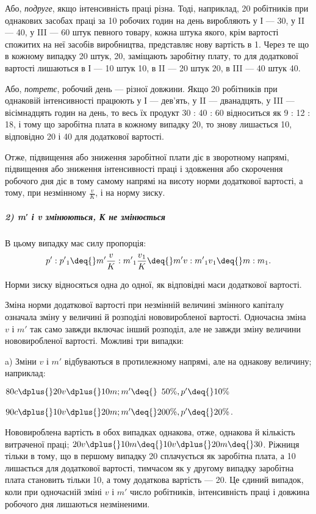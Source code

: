 Або, \emph{подруге}, якщо інтенсивність праці різна. Тоді, наприклад,
20 робітників при однакових засобах праці за 10 робочих
годин на день виробляють у І — 30, у II — 40, у III — 60 штук
певного товару, кожна штука якого, крім вартості спожитих
на неї засобів виробництва, представляє нову вартість в 1. Через те що в кожному випадку 20 штук, \deq{} 20, заміщають заробітну плату, то для додаткової
вартості лишаються в І — 10 штук \deq{} 10,
в II — 20 штук \deq{} 20, в III — 40 штук \deq{} 40.

Або, \emph{потретє}, робочий день — різної довжини. Якщо 20 робітників
при однаковій інтенсивності працюють у І — дев’ять,
у II — дванадцять, у III — вісімнадцять годин на день, то весь їх
продукт 30 : 40 : 60 відноситься як 9 : 12 : 18, і тому що заробітна
плата в кожному випадку \deq{} 20, то знову лишається 10, відповідно
20 і 40 для додаткової вартості.

Отже, підвищення або зниження заробітної плати діє в зворотному
напрямі, підвищення або зниження інтенсивності праці
і здовження або скорочення робочого дня діє в тому самому
напрямі на висоту норми додаткової вартості, а тому, при незмінному
$\frac{v}{K}$, і на норму зиску.

\subparagraph*{2) m′ і v змінюються, К не змінюється}
В цьому випадку має силу пропорція:\[
p': p'\textsubscript{1} \deq{} m' \frac{v}{K} : m'\textsubscript{1} \frac{v\textsubscript{1}}{K} \deq{} m'v : m'\textsubscript{1}v\textsubscript{1} \deq{} m : m\textsubscript{1}.\]

Норми зиску відносяться одна до одної, як відповідні маси
додаткової вартості.

Зміна норми додаткової вартості при незмінній величині змінного
капіталу означала зміну у величині й розподілі нововиробленої
вартості. Одночасна зміна $v$ і $m'$ так само завжди включає
інший розподіл, але не завжди зміну величини нововиробленої
вартості. Можливі три випадки:

a) Зміни $v$ і $m'$ відбуваються в протилежному напрямі, але
на однакову величину; наприклад:
\begin{center}
$80 c \dplus{} 20 v \dplus{} 10 m; m' \deq{} \phantom{0}50\%, p' \deq{} 10\%$

$90 c \dplus{} 10 v \dplus{} 20 m; m' \deq{} 200\%, p' \deq{} 20\%$.
\end{center}
Нововироблена вартість в обох випадках однакова, отже, однакова
й кількість витраченої праці; $20 v \dplus{} 10 m \deq{} 10 v \dplus{} 20 m \deq{} 30$.
Ріжниця тільки в тому, що в першому випадку 20 сплачується
як заробітна плата, а 10 лишається для додаткової вартості,
тимчасом як у другому випадку заробітна плата становить
тільки 10, а тому додаткова вартість — 20. Це єдиний випадок,
коли при одночасній зміні $v$ і $m'$ число робітників, інтенсивність
праці і довжина робочого дня лишаються незміненими.

